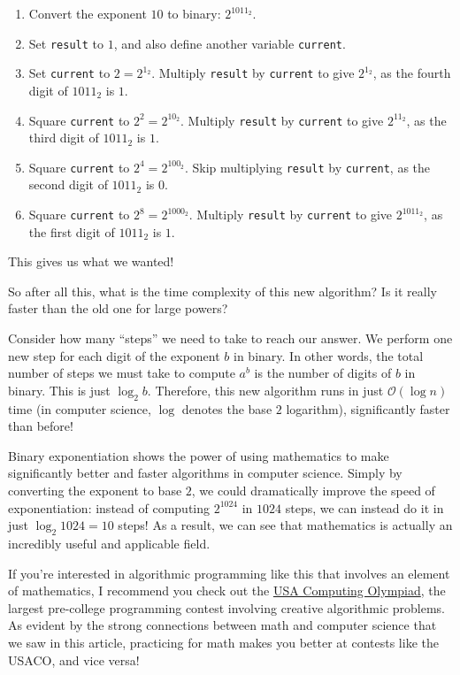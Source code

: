 \documentclass{article}
\begin{document}
\begin{enumerate}
    \item Convert the exponent $10$ to binary: $2^{1011_2}$.

    \item Set \texttt{result} to $1$, and also define another variable \texttt{current}.

    \item Set \texttt{current} to $2=2^{1_2}$. Multiply \texttt{result} by \texttt{current} to give $2^{1_2}$, as the fourth digit of $1011_2$ is $1$.

    \item Square \texttt{current} to $2^2=2^{10_2}$. Multiply \texttt{result} by \texttt{current} to give $2^{11_2}$, as the third digit of $1011_2$ is $1$.

    \item Square \texttt{current} to $2^4=2^{100_2}$. Skip multiplying \texttt{result} by \texttt{current}, as the second digit of $1011_2$ is $0$.

    \item Square \texttt{current} to $2^8=2^{1000_2}$. Multiply \texttt{result} by \texttt{current} to give $2^{1011_2}$, as the first digit of $1011_2$ is $1$.
\end{enumerate}

This gives us what we wanted!

So after all this, what is the time complexity of this new algorithm? Is it really faster than the old one for large powers?

Consider how many ``steps'' we need to take to reach our answer. We perform one new step for each digit of the exponent $b$ in binary. In other words, the total number of steps we must take to compute $a^b$ is the number of digits of $b$ in binary. This is just $\log_2{b}$. Therefore, this new algorithm runs in just $\mathcal{O}(\log{n})$ time (in computer science, $\log$ denotes the base $2$ logarithm), significantly faster than before!

Binary exponentiation shows the power of using mathematics to make significantly better and faster algorithms in computer science. Simply by converting the exponent to base $2$, we could dramatically improve the speed of exponentiation: instead of computing $2^{1024}$ in $1024$ steps, we can instead do it in just $\log_2{1024}=10$ steps! As a result, we can see that mathematics is actually an incredibly useful and applicable field.

If you're interested in algorithmic programming like this that involves an element of mathematics, I recommend you check out the \href{http://usaco.org/}{USA Computing Olympiad}, the largest pre-college programming contest involving creative algorithmic problems. As evident by the strong connections between math and computer science that we saw in this article, practicing for math makes you better at contests like the USACO, and vice versa!
\end{document}

